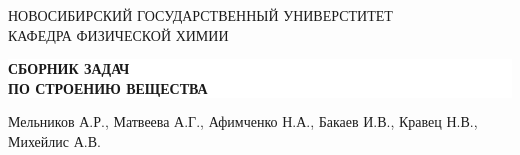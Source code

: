 

\begin{titlepage}
    \centering
    \small НОВОСИБИРСКИЙ ГОСУДАРСТВЕННЫЙ УНИВЕРСТИТЕТ\\
    КАФЕДРА ФИЗИЧЕСКОЙ ХИМИИ\\
    \vspace{14px}
    \colorbox{white}{
        \parbox[t]{0.975\textwidth}{%
            \parbox[t]{0.95\textwidth}{%
                \centering\vspace{0.75cm}\huge\scshape
                \textbf{СБОРНИК ЗАДАЧ\\ПО СТРОЕНИЮ ВЕЩЕСТВА} \\[3.5pt]
                \large\bf
            }
        }
    }
    
    \vspace{16px}
    \centering \normalsize Мельников А.Р., Матвеева А.Г., Афимченко Н.А., Бакаев И.В., Кравец Н.В., Михейлис А.В.
    \vspace{18px}


        
\end{titlepage}

